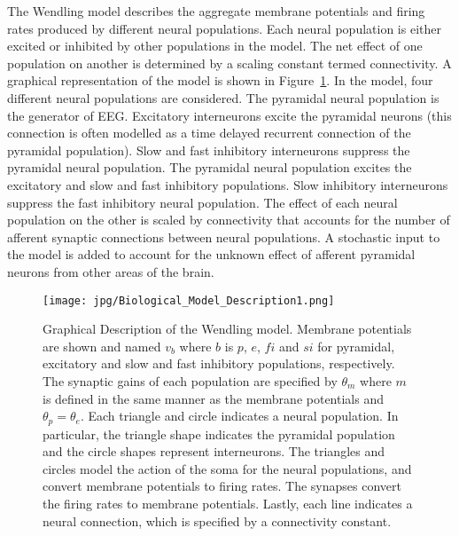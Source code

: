 The Wendling model describes the aggregate membrane potentials and firing rates produced by different neural populations. Each neural population is either excited or inhibited by other populations in the model. The net effect of one population on another is determined by a scaling constant termed connectivity. A graphical representation of the model is shown in Figure~\ref{fig: Biological}. In the model, four different neural populations are considered. The pyramidal neural population is the generator of EEG. Excitatory interneurons excite the pyramidal neurons (this connection is often modelled as a time delayed recurrent connection of the pyramidal population). Slow and fast inhibitory interneurons suppress the pyramidal neural population. The pyramidal neural population excites the excitatory and slow and fast inhibitory populations. Slow inhibitory interneurons suppress the fast inhibitory neural population. The effect of each neural population on the other is scaled by connectivity that accounts for the number of afferent synaptic connections between neural populations. A stochastic input to the model is added to account for the unknown effect of afferent pyramidal neurons from other areas of the brain.%
\begin{figure}  %
	\centering
		\texttt{[image: jpg/Biological\_Model\_Description1.png]}
	\caption{Graphical Description of the Wendling model. Membrane potentials are shown and named $v_{b}$ where $b$ is $p$, $e$, $fi$ and $si$ for pyramidal, excitatory and slow and fast inhibitory populations, respectively. The synaptic gains of each population are specified by $\theta_{m}$ where $m$ is defined in the same manner as the membrane potentials and $\theta_{p}=\theta_{e}$. Each triangle and circle indicates a neural population. In particular, the triangle shape indicates the pyramidal population and the circle shapes represent interneurons. The triangles and circles model the action of the soma for the neural populations, and convert membrane potentials to firing rates. The synapses convert the firing rates to membrane potentials. Lastly, each line indicates a neural connection, which is specified by a connectivity constant.}
	\label{fig: Biological}
\end{figure}%

